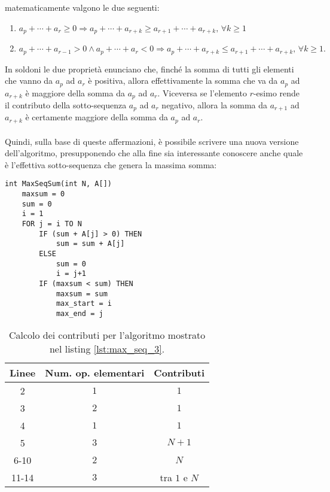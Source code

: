 \documentclass[11pt,a4paper,oneside]{article}
\begin{document}
matematicamente valgono le due seguenti:
\begin{enumerate}
	\item $a_p + \cdots + a_r \geq 0 \Rightarrow a_p + \cdots + a_{r+k} \geq a_{r+1} + \cdots + a_{r+k},\,\forall k \geq 1$ 
	\item $a_p + \cdots + a_{r-1} > 0 \wedge a_p + \cdots + a_r < 0 \Rightarrow a_p + \cdots + a_{r+k} \leq a_{r+1} + \cdots + a_{r+k},\, \forall k \geq 1\text{.}$
\end{enumerate}
In soldoni le due proprietà enunciano che, finché la somma di tutti gli elementi che vanno da $a_p$ ad $a_r$ è positiva, allora effettivamente la somma che va da $a_p$ ad $a_{r+k}$ è maggiore della somma da $a_p$ ad $a_r$. Viceversa se l'elemento $r$-esimo rende il contributo della sotto-sequenza $a_p$ ad $a_r$ negativo, allora la somma da $a_{r+1}$ ad $a_{r+k}$ è certamente maggiore della somma da $a_p$ ad $a_r$.\\\\Quindi, sulla base di queste affermazioni, è possibile scrivere una nuova versione dell'algoritmo, presupponendo che alla fine sia interessante conoscere anche quale è l'effettiva sotto-sequenza che genera la massima somma:

\begin{lstlisting}[caption={Calcolo della massima somma di una sotto-sequenza, versione 3.},label={lst:max_seq_3}]
int MaxSeqSum(int N, A[])
	maxsum = 0
	sum = 0
	i = 1
	FOR j = i TO N
		IF (sum + A[j] > 0) THEN
			sum = sum + A[j]
		ELSE
			sum = 0
			i = j+1
		IF (maxsum < sum) THEN
			maxsum = sum
			max_start = i
			max_end = j
\end{lstlisting}

\begin{table}[h]
	\centering
	\begin{tabular}{ c | c | c }
		\textbf{Linee} & \textbf{Num. op. elementari} & \textbf{Contributi} \\ \hline
		2 & $1$ & $1$ \\
		3 & $2$ & $1$ \\
		4 & $1$ & $1$ \\ 
		5 & $3$ & $N+1$ \\
		6-10 & $2$ & $N$ \\
		11-14 & $3$ & tra $1$ e $N$ \\
	\end{tabular}
	\caption{Calcolo dei contributi per l'algoritmo mostrato nel listing \ref{lst:max_seq_3}.}
	\label{tbl:max_seq_3}
\end{table}
\end{document}
